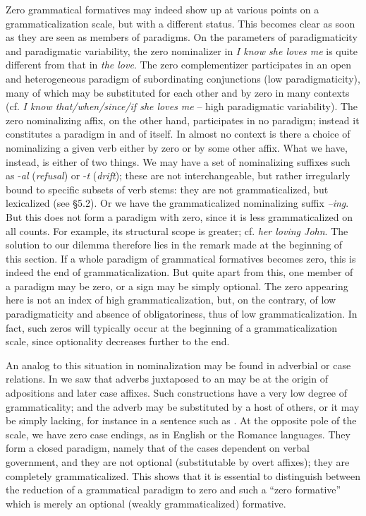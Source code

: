 Zero grammatical formatives may indeed show up at various points on a grammaticalization scale, but with a different status. This becomes clear as soon as they are seen as members of paradigms. On the parameters of paradigmaticity and paradigmatic variability, the zero nominalizer in \textit{I know she loves me} is quite different from that in \textit{the love}. The zero complementizer participates in an open and heterogeneous paradigm of subordinating conjunctions (low paradigmaticity), many of which may be substituted for each other and by zero in many contexts (cf. \textit{I know that/when/since/if she loves me} -- high paradigmatic variability). The zero nominalizing affix, on the other hand, participates in no paradigm; instead it constitutes a paradigm in and of itself. In almost no context is there a choice of nominalizing a given verb either by zero or by some other affix. What we have, instead, is either of two things. We may have a set of nominalizing suffixes such as -\textit{al} (\textit{refusal}) or -\textit{t} (\textit{drift}); these are not interchangeable, but rather irregularly bound to specific subsets of verb stems: they are not grammaticalized, but lexicalized (see §5.2). Or we have the grammaticalized nominalizing suffix \mbox{\textit{--ing}}. But this does not form a paradigm with zero, since it is less grammaticalized on all counts. For example, its structural scope is greater; cf. \textit{her loving John}. The solution to our dilemma therefore lies in the remark made at the beginning of this section. If a whole paradigm of grammatical formatives becomes zero, this is indeed the end of grammaticalization. But quite apart from this, one member of a paradigm may be zero, or a sign may be simply optional. The zero appearing here is not an index of high grammaticalization, but, on the contrary, of low paradigmaticity and absence of obligatoriness, thus of low grammaticalization. In fact, such zeros will typically occur at the beginning of a grammaticalization scale, since optionality decreases further to the end.

An analog to this situation in nominalization may be found in adverbial or case relations. In  we saw that adverbs juxtaposed to an \np may be at the origin of adpositions and later case affixes. Such constructions have a very low degree of grammaticality; and the adverb may be substituted by a host of others, or it may be simply lacking, for instance in a sentence such as . At the opposite pole of the scale, we have zero case endings, as in English or the Romance languages. They form a closed paradigm, namely that of the cases dependent on verbal government, and they are not optional (substitutable by overt affixes); they are completely grammaticalized. This shows that it is essential to distinguish between the reduction of a grammatical paradigm to zero and such a “zero formative” which is merely an optional (weakly grammaticalized) formative.

